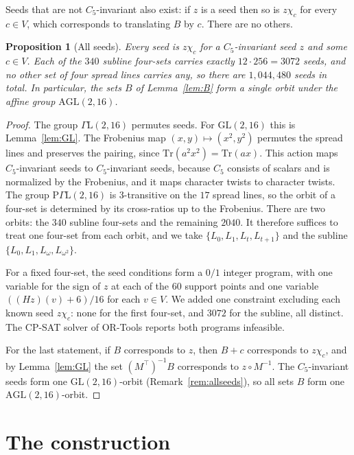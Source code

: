 \documentclass[11pt]{amsart}
\newtheorem{proposition}[theorem]{Proposition}
\theoremstyle{definition}
\newcommand{\GL}{\mathrm{GL}}
\newcommand{\Tr}{\mathrm{Tr}}
\begin{document}
Seeds that are not $C_5$-invariant also exist: if $z$ is a seed then so is $z\chi_c$ for every $c\in V$, which corresponds to translating $B$ by $c$. There are no others.

\begin{proposition}[All seeds]\label{prop:allseeds}
Every seed is $z\chi_c$ for a $C_5$-invariant seed $z$ and some $c\in V$. Each of the $340$ subline four-sets carries exactly $12\cdot256=3072$ seeds, and no other set of four spread lines carries any, so there are $1{,}044{,}480$ seeds in total. In particular, the sets $B$ of Lemma~\ref{lem:B} form a single orbit under the affine group $\mathrm{AGL}(2,16)$.
\end{proposition}

\begin{proof}
The group $\Gamma\mathrm{L}(2,16)$ permutes seeds. For $\GL(2,16)$ this is Lemma~\ref{lem:GL}. The Frobenius map $(x,y)\mapsto(x^2,y^2)$ permutes the spread lines and preserves the pairing, since $\Tr(a^2x^2)=\Tr(ax)$. This action maps $C_5$-invariant seeds to $C_5$-invariant seeds, because $C_5$ consists of scalars and is normalized by the Frobenius, and it maps character twists to character twists. The group $\mathrm{P}\Gamma\mathrm{L}(2,16)$ is $3$-transitive on the $17$ spread lines, so the orbit of a four-set is determined by its cross-ratios up to the Frobenius. There are two orbits: the $340$ subline four-sets and the remaining $2040$. It therefore suffices to treat one four-set from each orbit, and we take $\{L_0,L_1,L_t,L_{t+1}\}$ and the subline $\{L_0,L_1,L_\omega,L_{\omega^2}\}$.

For a fixed four-set, the seed conditions form a $0/1$ integer program, with one variable for the sign of $z$ at each of the $60$ support points and one variable $((Hz)(v)+6)/16$ for each $v\in V$. We added one constraint excluding each known seed $z\chi_c$: none for the first four-set, and $3072$ for the subline, all distinct. The CP-SAT solver of OR-Tools reports both programs infeasible.

For the last statement, if $B$ corresponds to $z$, then $B+c$ corresponds to $z\chi_c$, and by Lemma~\ref{lem:GL} the set $(M^\top)^{-1}B$ corresponds to $z\circ M^{-1}$. The $C_5$-invariant seeds form one $\GL(2,16)$-orbit (Remark~\ref{rem:allseeds}), so all sets $B$ form one $\mathrm{AGL}(2,16)$-orbit.
\end{proof}

\section{The construction}\label{sec:construction}
\end{document}

